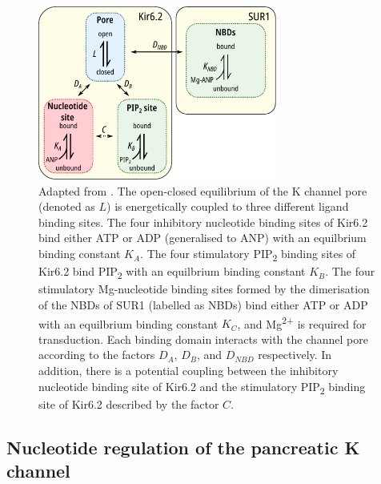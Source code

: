 \begin{figure}[hbtp]
	\centering
	\includegraphics[width=0.7\textwidth]{regulation_diagram.pdf}
	\caption[Modes of regulation of K\ATP{}]{
	{\bf{}}
	Adapted from \textcite{puljung_cryo-electron_2018}.
	The open-closed equilibrium of the K\ATP{} channel pore (denoted as $L$) is energetically coupled to three different ligand binding sites.
	The four inhibitory nucleotide binding sites of Kir6.2 bind either ATP or ADP (generalised to ANP) with an equilbrium binding constant $K_A$.
	The four stimulatory PIP\textsubscript{2} binding sites of Kir6.2 bind PIP\textsubscript{2} with an equilbrium binding constant $K_B$.
	The four stimulatory Mg-nucleotide binding sites formed by the dimerisation of the NBDs of SUR1 (labelled as NBDs) bind either ATP or ADP with an equilbrium binding constant $K_C$, and Mg\textsuperscript{2+} is required for transduction.
	Each binding domain interacts with the channel pore according to the factors $D_A$, $D_B$, and $D_{NBD}$ respectively.
	In addition, there is a potential coupling between the inhibitory nucleotide binding site of Kir6.2 and the stimulatory PIP\textsubscript{2} binding site of Kir6.2 described by the factor $C$.
	}\label{ch1fig:regulation_diagram}
\end{figure}

\subsection{Nucleotide regulation of the pancreatic K\ATP{} channel}

